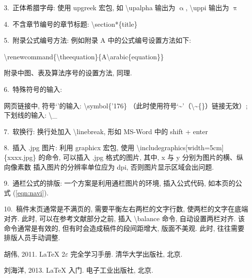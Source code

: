 \documentclass[twoside,twocolumn]{article}
\begin{document}
\begin{CJK}{UTF8}{song}
3.~正体希腊字母: 使用 upgreek 宏包, 如 \textbackslash upalpha 输出为 $\upalpha$, \textbackslash uppi 输出为 $\uppi$

4.~不含章节编号的章节标题: \textbackslash section*\{title\}

5.~附录公式编号方法: 例如附录 A 中的公式编号设置方法如下: 


\noindent
{\small\textbackslash renewcommand\{\textbackslash theequation\}\{A\textbackslash arabic\{equation\}\}}

\noindent 附录中图、表及算法序号的设置方法, 同理. 


6.~特殊符号的输入: 

网页链接中, 符号‘’的输入: \textbackslash symbol\{'176\}
（此时使用符号‘\~{}’（\textbackslash\~{}\{\}）链接无效）; 
下划线的输入: \textbackslash \_

7.~软换行: 换行处加入 \textbackslash linebreak, 形如 MS-Word 中的 shift + enter

8.~插入 .jpg 图片: 利用 graphicx 宏包, 
使用 \textbackslash includegraphics[width=5cm]\{xxxx.jpg\}
的命令, 可以插入 .jpg 格式的图片, 其中, x 与 y 分别为图片的横、纵向像素数
插入图片的分辨率单位应为 dpi, 否则图片显示区域会出问题. 

9.~通栏公式的排版: 一个方案是利用通栏图片的环境, 
插入公式代码, 如本页的公式 (\ref{eqn:navi}). 

10.~稿件末页通常是不满页的, 需要平衡左右两栏的文字行数, 
使两栏的文字在底端对齐. 此时, 可以在参考文献部分之前, 插入
\textbackslash balance 命令, 自动设置两栏对齐. 
该命令通常是有效的, 但有时会造成稿件的段间距增大, 
版面不美观. 此时, 往往需要排版人员手动调整. 


%
%

\begin{thebibliography}{}\footnotesize
	\itemsep -4pt
	\vspace{-8pt}
	
	胡伟, 2011.
	\newblock \LaTeX{} 2$\varepsilon$ 完全学习手册.
	\newblock 清华大学出版社, 北京.
	
	刘海洋, 2013.
	\newblock \LaTeX{} 入门.
	\newblock 电子工业出版社, 北京.
	
	
\end{thebibliography}


\end{CJK}
\end{document}
